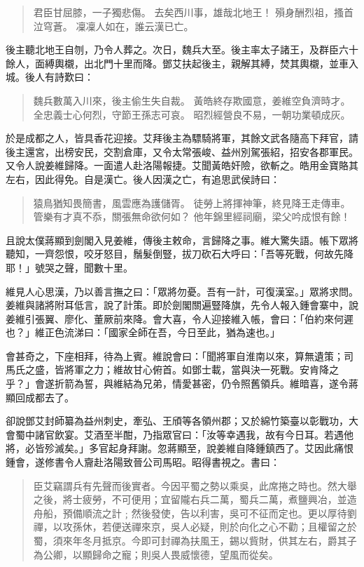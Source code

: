 \begin{quote}
君臣甘屈膝，一子獨悲傷。
去矣西川事，雄哉北地王！
殞身酬烈祖，搔首泣穹蒼。
凜凜人如在，誰云漢已亡。
\end{quote}

後主聽北地王自刎，乃令人葬之。次日，魏兵大至。後主率太子諸王，及群臣六十餘人，面縛輿櫬，出北門十里而降。鄧艾扶起後主，親解其縛，焚其輿櫬，並車入城。後人有詩歎曰：

\begin{quote}
魏兵數萬入川來，後主偷生失自裁。
黃皓終存欺國意，姜維空負濟時才。
全忠義士心何烈，守節王孫志可哀。
昭烈經營良不易，一朝功業頓成灰。
\end{quote}

於是成都之人，皆具香花迎接。艾拜後主為驃騎將軍，其餘文武各隨高下拜官，請後主還宮，出榜安民，交割倉庫，又令太常張峻、益州別駕張紹，招安各郡軍民。又令人說姜維歸降。一面遣人赴洛陽報捷。艾聞黃皓奸險，欲斬之。皓用金寶賂其左右，因此得免。自是漢亡。後人因漢之亡，有追思武侯詩曰：

\begin{quote}
猿鳥猶知畏簡書，風雲應為護儲胥。
徒勞上將揮神筆，終見降王走傳車。
管樂有才真不忝，關張無命欲何如？
他年錦里經祠廟，梁父吟成恨有餘！
\end{quote}

且說太僕蔣顯到劍閣入見姜維，傳後主敕命，言歸降之事。維大驚失語。帳下眾將聽知，一齊怨恨，咬牙怒目，鬚髮倒豎，拔刀砍石大呼曰：「吾等死戰，何故先降耶！」號哭之聲，聞數十里。

維見人心思漢，乃以善言撫之曰：「眾將勿憂。吾有一計，可復漢室。」眾將求問。姜維與諸將附耳低言，說了計策。即於劍閣關遍豎降旗，先令人報入鍾會寨中，說姜維引張翼、廖化、董厥前來降。會大喜，令人迎接維入帳，會曰：「伯約來何遲也？」維正色流涕曰：「國家全師在吾，今日至此，猶為速也。」

會甚奇之，下座相拜，待為上賓。維說會曰：「聞將軍自淮南以來，算無遺策；司馬氏之盛，皆將軍之力；維故甘心俯首。如鄧士載，當與決一死戰。安肯降之乎？」會遂折箭為誓，與維結為兄弟，情愛甚密，仍令照舊領兵。維暗喜，遂令蔣顯回成都去了。

卻說鄧艾封師纂為益州刺史，牽弘、王頎等各領州郡；又於綿竹築臺以彰戰功，大會蜀中諸官飲宴。艾酒至半酣，乃指眾官曰：「汝等幸遇我，故有今日耳。若遇他將，必皆殄滅矣。」多官起身拜謝。忽蔣顯至，說姜維自降鍾鎮西了。艾因此痛恨鍾會，遂修書令人齎赴洛陽致晉公司馬昭。昭得書視之。書曰：

\begin{quote}
臣艾竊謂兵有先聲而後實者。今因平蜀之勢以乘吳，此席捲之時也。然大舉之後，將士疲勞，不可便用；宜留隴右兵二萬，蜀兵二萬，煮鹽興冶，並造舟船，預備順流之計﹔然後發使，告以利害，吳可不征而定也。更以厚待劉禪，以攻孫休，若便送禪來京，吳人必疑，則於向化之心不勸；且權留之於蜀，須來年冬月抵京。今即可封禪為扶風王，錫以貲財，供其左右，爵其子為公卿，以顯歸命之寵；則吳人畏威懷德，望風而從矣。
\end{quote}

